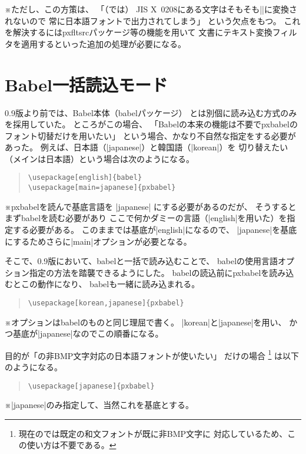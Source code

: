 \documentclass[uplatex,dvipdfmx,a4paper]{jsarticle}
\newcommand{\Pkg}[1]{\textsf{#1}}
\newcommand{\Note}{\par\noindent ※}
\newcommand{\XS}{\hspace{\xkanjiskip}}
\begin{document}
\Note ただし、この方策は、
「（{\pLaTeX}では）
JIS X~0208にある文字はそもそも\XS|\UTF|に変換されないので
常に日本語フォントで出力されてしまう」
という欠点をもつ。
これを解決するには\Pkg{pxfltsrc}パッケージ等の機能を用いて
文書にテキスト変換フィルタを適用するといった追加の処理が必要になる。

\section{Babel一括読込モード}
\label{sec:Lumped-Loading}

0.9版より前では、Babel本体（\Pkg{babel}パッケージ）
とは別個に読み込む方式のみを採用していた。
ところがこの場合、
「Babelの本来の機能は不要で\Pkg{pxbabel}の
フォント切替だけを用いたい」
という場合、かなり不自然な指定をする必要があった。
例えば、日本語（|japanese|）と韓国語（|korean|）を
切り替えたい（メインは日本語）という場合は次のようになる。

\begin{quote}\begin{verbatim}
\usepackage[english]{babel}
\usepackage[main=japanese]{pxbabel}
\end{verbatim}\end{quote}
\Note \Pkg{pxbabel}を読んで基底言語を |japanese|
にする必要があるのだが、
そうするとまず\Pkg{babel}を読む必要があり
ここで何かダミーの言語（|english|を用いた）を指定する必要がある。
このままでは基底が|english|になるので、
|japanese|を基底にするためさらに|main|オプションが必要となる。

そこで、0.9版において、\Pkg{babel}と一括で読み込むことで、
\Pkg{babel}の使用言語オプション指定の方法を踏襲できるようにした。
\Pkg{babel}の読込前に\Pkg{pxbabel}を読み込むとこの動作になり、
\Pkg{babel}も一緒に読み込まれる。

\begin{quote}\begin{verbatim}
\usepackage[korean,japanese]{pxbabel}
\end{verbatim}\end{quote}
\Note オプションは\Pkg{babel}のものと同じ理屈で書く。
|korean|と|japanese|を用い、
かつ基底が|japanese|なのでこの順番になる。

目的が「{\upTeX}の非BMP文字対応の日本語フォントが使いたい」
だけの場合
\footnote{現在の{\upLaTeX}では既定の和文フォントが既に非BMP文字に
対応しているため、この使い方は不要である。}%
は以下のようになる。

\begin{quote}\begin{verbatim}
\usepackage[japanese]{pxbabel}
\end{verbatim}\end{quote}
\Note |japanese|のみ指定して、当然これを基底とする。
\end{document}
